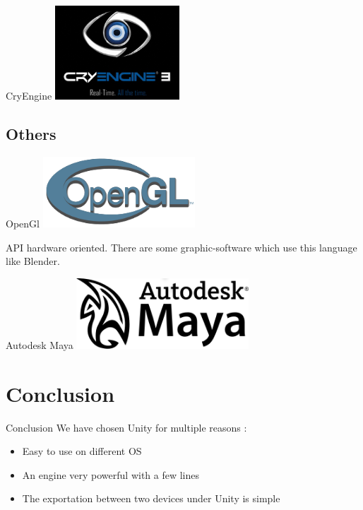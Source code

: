 \documentclass[a4paper,10pt]{beamer}
\begin{document}
			\begin{frame}{CryEngine}
				\includegraphics[height=100pt]{images/Cry_Engine.png}
			\end{frame}
			
		\subsection{Others}
			
			\begin{frame}{OpenGl}
				\includegraphics[height=75pt]{images/OpenGL_logo.png}
				
				API hardware oriented. There are some graphic-software which use this language like Blender.
			\end{frame}
			
			\begin{frame}{Autodesk Maya}
				\includegraphics[height=75pt]{images/AutoDesk_Maya.png}
			\end{frame}
			
	\section{Conclusion}
		
		\begin{frame}{Conclusion}
			We have chosen Unity for multiple reasons :
			\begin{itemize}
				\item Easy to use on different OS
				\item An engine very powerful with a few lines
				\item The exportation between two devices under Unity is simple
			\end{itemize}			
		\end{frame}
	
\end{document}
